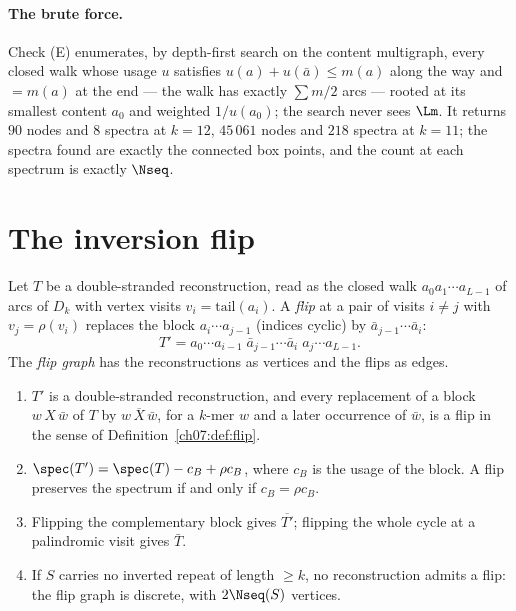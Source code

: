 \paragraph{The brute force.}
Check (E) enumerates, by depth-first search on the content multigraph, every closed walk
whose usage $u$ satisfies $u(a)+u(\bar a)\le m(a)$ along the way and $=m(a)$ at the end ---
the walk has exactly $\sum m/2$ arcs --- rooted at its smallest content $a_0$ and weighted
$1/u(a_0)$; the search never sees $\Lm$. It returns $90$ nodes and $8$ spectra at $k=12$,
$45\,061$ nodes and $218$ spectra at $k=11$; the spectra found are exactly the connected box
points, and the count at each spectrum is exactly $\Nseq$.

\section{The inversion flip}\label{ch07:sec:flip}

\begin{definition}\label{ch07:def:flip}
Let $T$ be a double-stranded reconstruction, read as the closed walk $a_0a_1\cdots a_{L-1}$
of arcs of $D_k$ with vertex visits $v_i=\mathrm{tail}(a_i)$. A \emph{flip} at a pair of
visits $i\neq j$ with $v_j=\rho(v_i)$ replaces the block $a_i\cdots a_{j-1}$ (indices cyclic)
by $\bar a_{j-1}\cdots\bar a_i$:
\[
  T'=a_0\cdots a_{i-1}\;\bar a_{j-1}\cdots\bar a_{i}\;a_j\cdots a_{L-1}.
\]
The \emph{flip graph} has the reconstructions as vertices and the flips as edges.
\end{definition}

\begin{proposition}\label{ch07:prop:flip}
\begin{enumerate}
\item[\rm(a)] $T'$ is a double-stranded reconstruction, and every replacement of a block
$w\,X\,\bar w$ of $T$ by $w\,\overline X\,\bar w$, for a $k$-mer $w$ and a later occurrence of
$\bar w$, is a flip in the sense of Definition~\ref{ch07:def:flip}.
\item[\rm(b)] $\spec(T')=\spec(T)-c_B+\rho c_B$, where $c_B$ is the usage of the block. A flip
preserves the spectrum if and only if $c_B=\rho c_B$.
\item[\rm(c)] Flipping the complementary block gives $\overline{T'}$; flipping the whole
cycle at a palindromic visit gives $\bar T$.
\item[\rm(d)] If $S$ carries no inverted repeat of length $\ge k$, no reconstruction admits a
flip: the flip graph is discrete, with $2\Nseq(S)$ vertices.
\end{enumerate}
\end{proposition}

